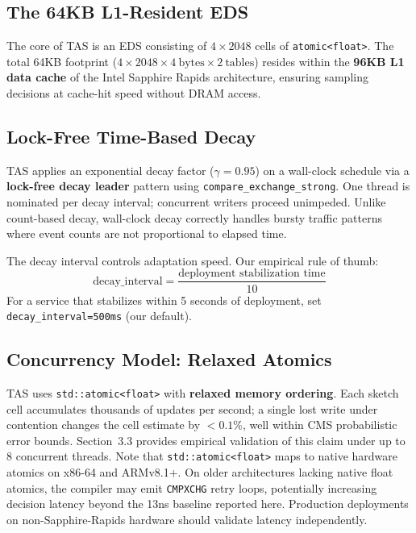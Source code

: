 \documentclass[sigconf,nonacm]{acmart}
\begin{document}
\subsection{The 64KB L1-Resident EDS}

The core of TAS is an EDS consisting of $4 \times 2048$ cells of \texttt{atomic<float>}.
The total 64KB footprint ($4 \times 2048 \times 4~\text{bytes} \times 2~\text{tables}$)
resides within the \textbf{96KB L1 data cache} of the Intel Sapphire Rapids architecture,
ensuring sampling decisions at cache-hit speed without DRAM access.

\subsection{Lock-Free Time-Based Decay}

TAS applies an exponential decay factor ($\gamma=0.95$) on a wall-clock schedule via a
\textbf{lock-free decay leader} pattern using \texttt{compare\_exchange\_strong}. One
thread is nominated per decay interval; concurrent writers proceed unimpeded. Unlike
count-based decay, wall-clock decay correctly handles bursty traffic patterns where
event counts are not proportional to elapsed time.

The decay interval controls adaptation speed. Our empirical rule of thumb:
\[
  \text{decay\_interval} = \frac{\text{deployment stabilization time}}{10}
\]
For a service that stabilizes within 5 seconds of deployment, set
\texttt{decay\_interval=500ms} (our default).

\subsection{Concurrency Model: Relaxed Atomics}

TAS uses \texttt{std::atomic<float>} with \textbf{relaxed memory ordering}. Each sketch
cell accumulates thousands of updates per second; a single lost write under contention
changes the cell estimate by $<0.1\%$, well within CMS probabilistic error bounds.
Section~3.3 provides empirical validation of this claim under up to 8 concurrent threads.
Note that \texttt{std::atomic<float>} maps to native hardware atomics on x86-64 and
ARMv8.1+. On older architectures lacking native float atomics, the compiler may emit
\texttt{CMPXCHG} retry loops, potentially increasing decision latency beyond the 13ns
baseline reported here. Production deployments on non-Sapphire-Rapids hardware should
validate latency independently.
\end{document}
